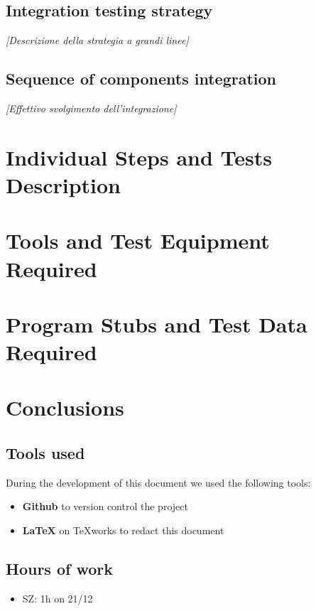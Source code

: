 \documentclass[11pt]{article} %
\begin{document}
\subsection{Integration testing strategy}
\textit{[Descrizione della strategia a grandi linee]}


\subsection{Sequence of components integration}
\textit{[Effettivo svolgimento dell'integrazione]}




\newpage
\section{Individual Steps and Tests Description}








\newpage
\section{Tools and Test Equipment Required}



\newpage
\section{Program Stubs and Test Data Required}






\newpage
\section{Conclusions}

\subsection{Tools used}
During the development of this document we used the following tools:
\begin{itemize}
	\item \textbf{Github} to version control the project
	\item \textbf{\LaTeX} on TeXworks to redact this document
\end{itemize}

\subsection{Hours of work}
\begin{itemize}
	\item SZ: 1h on 21/12
\end{itemize}
\end{document}
